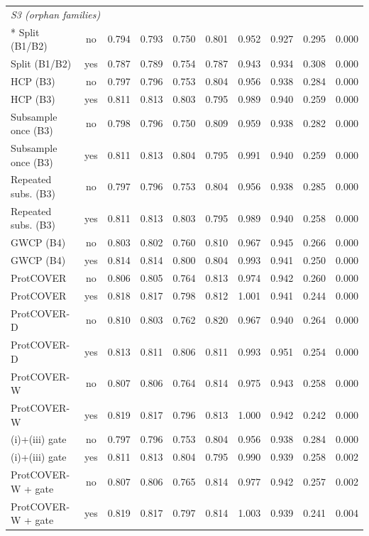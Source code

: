 \begin{longtable}{lccccccccc}
\midrule
\multicolumn{10}{l}{\emph{S3 (orphan families)}}\\*
Split (B1/B2) & no & 0.794 & 0.793 & 0.750 & 0.801 & 0.952 & 0.927 & 0.295 & 0.000 \\
Split (B1/B2) & yes & 0.787 & 0.789 & 0.754 & 0.787 & 0.943 & 0.934 & 0.308 & 0.000 \\
HCP (B3) & no & 0.797 & 0.796 & 0.753 & 0.804 & 0.956 & 0.938 & 0.284 & 0.000 \\
HCP (B3) & yes & 0.811 & 0.813 & 0.803 & 0.795 & 0.989 & 0.940 & 0.259 & 0.000 \\
Subsample once (B3) & no & 0.798 & 0.796 & 0.750 & 0.809 & 0.959 & 0.938 & 0.282 & 0.000 \\
Subsample once (B3) & yes & 0.811 & 0.813 & 0.804 & 0.795 & 0.991 & 0.940 & 0.259 & 0.000 \\
Repeated subs. (B3) & no & 0.797 & 0.796 & 0.753 & 0.804 & 0.956 & 0.938 & 0.285 & 0.000 \\
Repeated subs. (B3) & yes & 0.811 & 0.813 & 0.803 & 0.795 & 0.989 & 0.940 & 0.258 & 0.000 \\
GWCP (B4) & no & 0.803 & 0.802 & 0.760 & 0.810 & 0.967 & 0.945 & 0.266 & 0.000 \\
GWCP (B4) & yes & 0.814 & 0.814 & 0.800 & 0.804 & 0.993 & 0.941 & 0.250 & 0.000 \\
ProtCOVER & no & 0.806 & 0.805 & 0.764 & 0.813 & 0.974 & 0.942 & 0.260 & 0.000 \\
ProtCOVER & yes & 0.818 & 0.817 & 0.798 & 0.812 & 1.001 & 0.941 & 0.244 & 0.000 \\
ProtCOVER-D & no & 0.810 & 0.803 & 0.762 & 0.820 & 0.967 & 0.940 & 0.264 & 0.000 \\
ProtCOVER-D & yes & 0.813 & 0.811 & 0.806 & 0.811 & 0.993 & 0.951 & 0.254 & 0.000 \\
ProtCOVER-W & no & 0.807 & 0.806 & 0.764 & 0.814 & 0.975 & 0.943 & 0.258 & 0.000 \\
ProtCOVER-W & yes & 0.819 & 0.817 & 0.796 & 0.813 & 1.000 & 0.942 & 0.242 & 0.000 \\
(i)+(iii) gate & no & 0.797 & 0.796 & 0.753 & 0.804 & 0.956 & 0.938 & 0.284 & 0.000 \\
(i)+(iii) gate & yes & 0.811 & 0.813 & 0.804 & 0.795 & 0.990 & 0.939 & 0.258 & 0.002 \\
ProtCOVER-W + gate & no & 0.807 & 0.806 & 0.765 & 0.814 & 0.977 & 0.942 & 0.257 & 0.002 \\
ProtCOVER-W + gate & yes & 0.819 & 0.817 & 0.797 & 0.814 & 1.003 & 0.939 & 0.241 & 0.004 \\

\end{longtable}

